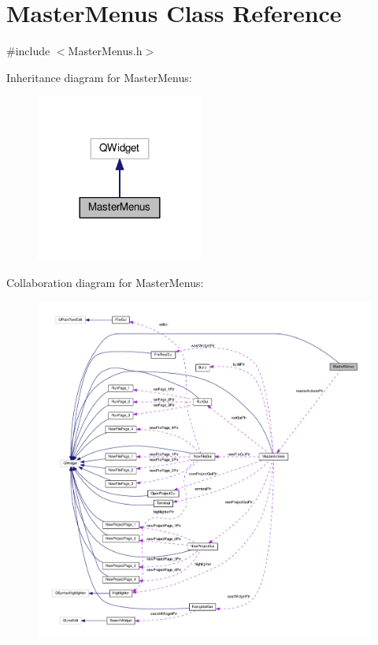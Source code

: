 \hypertarget{class_master_menus}{\section{Master\-Menus Class Reference}
\label{class_master_menus}
}


{\ttfamily \#include $<$Master\-Menus.\-h$>$}



Inheritance diagram for Master\-Menus\-:\nopagebreak
\begin{figure}[H]
\begin{center}
\leavevmode
\includegraphics[width=156pt]{class_master_menus__inherit__graph}
\end{center}
\end{figure}


Collaboration diagram for Master\-Menus\-:
\nopagebreak
\begin{figure}[H]
\begin{center}
\leavevmode
\includegraphics[width=350pt]{class_master_menus__coll__graph}
\end{center}
\end{figure}
